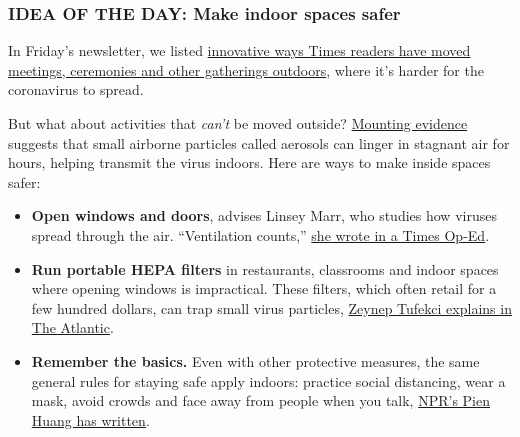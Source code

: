 \hypertarget{idea-of-the-day-make-indoor-spaces-safer}{%
\subsubsection{\texorpdfstring{\textbf{IDEA OF THE DAY: Make indoor
spaces
safer}}{IDEA OF THE DAY: Make indoor spaces safer}}\label{idea-of-the-day-make-indoor-spaces-safer}}

In Friday's newsletter, we listed
\href{https://www.nytimes.com/2020/07/30/briefing/move-everything-outdoors-our-readers-respond.html}{innovative
ways Times readers have moved meetings, ceremonies and other gatherings
outdoors}, where it's harder for the coronavirus to spread.

But what about activities that \emph{can't} be moved outside?
\href{https://www.nytimes.com/2020/07/09/health/virus-aerosols-who.html}{Mounting
evidence} suggests that small airborne particles called aerosols can
linger in stagnant air for hours, helping transmit the virus indoors.
Here are ways to make inside spaces safer:

\begin{itemize}
\tightlist
\item
  \textbf{Open windows and doors}, advises Linsey Marr, who studies how
  viruses spread through the air. ``Ventilation counts,''
  \href{https://www.nytimes.com/2020/07/30/opinion/coronavirus-aerosols.html}{she
  wrote in a Times Op-Ed}.
\end{itemize}

\begin{itemize}
\tightlist
\item
  \textbf{Run portable HEPA filters} in restaurants, classrooms and
  indoor spaces where opening windows is impractical. These filters,
  which often retail for a few hundred dollars, can trap small virus
  particles,
  \href{https://www.theatlantic.com/health/archive/2020/07/why-arent-we-talking-more-about-airborne-transmission/614737/}{Zeynep
  Tufekci explains in The Atlantic}.
\end{itemize}

\begin{itemize}
\tightlist
\item
  \textbf{Remember the basics.} Even with other protective measures, the
  same general rules for staying safe apply indoors: practice social
  distancing, wear a mask, avoid crowds and face away from people when
  you talk,
  \href{https://www.npr.org/sections/goatsandsoda/2020/07/11/889716534/coronavirus-faq-how-do-i-protect-myself-if-the-coronavirus-can-linger-in-the-air}{NPR's
  Pien Huang has written}.
\end{itemize}

